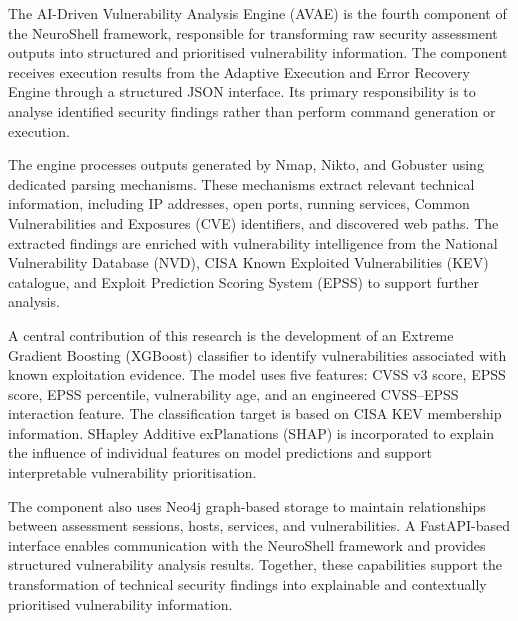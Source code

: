 \documentclass[
]{article}
\begin{document}
The AI-Driven Vulnerability Analysis Engine (AVAE) is the fourth
component of the NeuroShell framework, responsible for transforming raw
security assessment outputs into structured and prioritised
vulnerability information. The component receives execution results from
the Adaptive Execution and Error Recovery Engine through a structured
JSON interface. Its primary responsibility is to analyse identified
security findings rather than perform command generation or execution.

The engine processes outputs generated by Nmap, Nikto, and Gobuster
using dedicated parsing mechanisms. These mechanisms extract relevant
technical information, including IP addresses, open ports, running
services, Common Vulnerabilities and Exposures (CVE) identifiers, and
discovered web paths. The extracted findings are enriched with
vulnerability intelligence from the National Vulnerability Database
(NVD), CISA Known Exploited Vulnerabilities (KEV) catalogue, and Exploit
Prediction Scoring System (EPSS) to support further analysis.

A central contribution of this research is the development of an Extreme
Gradient Boosting (XGBoost) classifier to identify vulnerabilities
associated with known exploitation evidence. The model uses five
features: CVSS v3 score, EPSS score, EPSS percentile, vulnerability age,
and an engineered CVSS--EPSS interaction feature. The classification
target is based on CISA KEV membership information. SHapley Additive
exPlanations (SHAP) is incorporated to explain the influence of
individual features on model predictions and support interpretable
vulnerability prioritisation.

The component also uses Neo4j graph-based storage to maintain
relationships between assessment sessions, hosts, services, and
vulnerabilities. A FastAPI-based interface enables communication with
the NeuroShell framework and provides structured vulnerability analysis
results. Together, these capabilities support the transformation of
technical security findings into explainable and contextually
prioritised vulnerability information.
\end{document}
